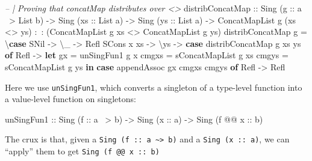 \documentclass[]{article}
\newenvironment{Shaded}{}{}
\newcommand{\CommentTok}[1]{\textcolor[rgb]{0.38,0.63,0.69}{\textit{#1}}}
\newcommand{\DataTypeTok}[1]{\textcolor[rgb]{0.56,0.13,0.00}{#1}}
\newcommand{\FunctionTok}[1]{\textcolor[rgb]{0.02,0.16,0.49}{#1}}
\newcommand{\KeywordTok}[1]{\textcolor[rgb]{0.00,0.44,0.13}{\textbf{#1}}}
\newcommand{\NormalTok}[1]{#1}
\newcommand{\OtherTok}[1]{\textcolor[rgb]{0.00,0.44,0.13}{#1}}
\begin{document}
\begin{Shaded}
\begin{Highlighting}[]
\CommentTok{-- | Proving that concatMap distributes over <>}
\NormalTok{distribConcatMap}
\OtherTok{    ::} \DataTypeTok{Sing}\NormalTok{ (}\OtherTok{g ::}\NormalTok{ a }\FunctionTok{~>} \DataTypeTok{List}\NormalTok{ b)}
    \OtherTok{->} \DataTypeTok{Sing}\NormalTok{ (}\OtherTok{xs ::} \DataTypeTok{List}\NormalTok{ a)}
    \OtherTok{->} \DataTypeTok{Sing}\NormalTok{ (}\OtherTok{ys ::} \DataTypeTok{List}\NormalTok{ a)}
    \OtherTok{->} \DataTypeTok{ConcatMapList}\NormalTok{ g (xs }\FunctionTok{<>}\NormalTok{ ys) }\FunctionTok{:~:}\NormalTok{ (}\DataTypeTok{ConcatMapList}\NormalTok{ g xs }\FunctionTok{<>} \DataTypeTok{ConcatMapList}\NormalTok{ g ys)}
\NormalTok{distribConcatMap g }\FunctionTok{=}\NormalTok{ \textbackslash{}}\KeywordTok{case}
    \DataTypeTok{SNil} \OtherTok{->}\NormalTok{ \textbackslash{}_ }\OtherTok{->} \DataTypeTok{Refl}
    \DataTypeTok{SCons}\NormalTok{ x xs }\OtherTok{->}\NormalTok{ \textbackslash{}ys }\OtherTok{->}
      \KeywordTok{case}\NormalTok{ distribConcatMap g xs ys }\KeywordTok{of}
        \DataTypeTok{Refl} \OtherTok{->}
          \KeywordTok{let}\NormalTok{ gx    }\FunctionTok{=}\NormalTok{ unSingFun1 g x}
\NormalTok{              cmgxs }\FunctionTok{=}\NormalTok{ sConcatMapList g xs}
\NormalTok{              cmgys }\FunctionTok{=}\NormalTok{ sConcatMapList g ys}
          \KeywordTok{in}  \KeywordTok{case}\NormalTok{ appendAssoc gx cmgxs cmgys }\KeywordTok{of}
                \DataTypeTok{Refl} \OtherTok{->} \DataTypeTok{Refl}
\end{Highlighting}
\end{Shaded}

Here we use \texttt{unSingFun1}, which converts a singleton of a type-level
function into a value-level function on singletons:

\begin{Shaded}
\begin{Highlighting}[]
\NormalTok{unSingFun1}
\OtherTok{    ::} \DataTypeTok{Sing}\NormalTok{  (}\OtherTok{f      ::}\NormalTok{ a }\FunctionTok{~>}\NormalTok{ b)}
    \OtherTok{->} \DataTypeTok{Sing}\NormalTok{  (}\OtherTok{x      ::}\NormalTok{ a)}
    \OtherTok{->} \DataTypeTok{Sing}\NormalTok{  (f }\FunctionTok{@@}\OtherTok{ x ::}\NormalTok{ b)}
\end{Highlighting}
\end{Shaded}

The crux is that, given a
\texttt{Sing\ (f\ ::\ a\ \textasciitilde{}\textgreater{}\ b)} and a
\texttt{Sing\ (x\ ::\ a)}, we can ``apply'' them to get
\texttt{Sing\ (f\ @@\ x\ ::\ b)}
\end{document}
